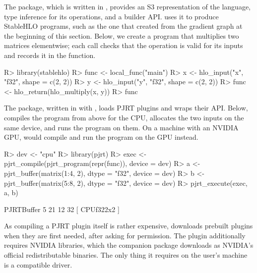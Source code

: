 \documentclass[article,shortnames]{jss}
\renewenvironment{CodeChunk}{\par\addvspace{0.6\baselineskip}\noindent\begin{minipage}{\linewidth}}{\end{minipage}\par\vspace{0.6\baselineskip}}
\newcommand{\fitcode}{\fvset{fontsize=\small}}
\begin{document}
The  package, which is written in , provides an S3 representation of the language, type inference for its operations, and a builder API.
 uses it to produce StableHLO programs, such as the one that  created from the gradient graph at the beginning of this section.
Below, we create a program that multiplies two  matrices elementwise; each  call checks that the operation is valid for its inputs and records it in the function.

\begin{CodeChunk}
\fitcode
\begin{CodeInput}
R> library(stablehlo)
R> func <- local_func("main")
R> x <- hlo_input("x", "f32", shape = c(2, 2))
R> y <- hlo_input("y", "f32", shape = c(2, 2))
R> func <- hlo_return(hlo_multiply(x, y))
R> func
\end{CodeInput}
\end{CodeChunk}

The  package, written in  with  \citep{ref-rcpp}, loads PJRT plugins and wraps their  API.
Below,  compiles the program from above for the CPU,  allocates the two inputs on the same device, and  runs the program on them.
On a machine with an NVIDIA GPU,  would compile and run the program on the GPU instead.

\begin{CodeChunk}
\begin{CodeInput}
R> dev <- "cpu"
R> library(pjrt)
R> exec <- pjrt_compile(pjrt_program(repr(func)), device = dev)
R> a <- pjrt_buffer(matrix(1:4, 2), dtype = "f32", device = dev)
R> b <- pjrt_buffer(matrix(5:8, 2), dtype = "f32", device = dev)
R> pjrt_execute(exec, a, b)
\end{CodeInput}
\begin{CodeOutput}
PJRTBuffer
  5 21
 12 32
[ CPUf32{2x2} ]
\end{CodeOutput}
\end{CodeChunk}

As compiling a PJRT plugin itself is rather expensive,  downloads prebuilt plugins when they are first needed, after asking for permission.
The  plugin additionally requires NVIDIA libraries, which the companion package  downloads as NVIDIA's official redistributable binaries.
The only thing it requires on the user's machine is a compatible  driver.
\end{document}
